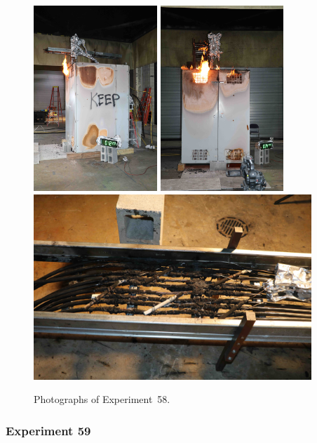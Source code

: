 \documentclass[12pt]{article}
\begin{document}
\begin{figure}[p]
\centering
\includegraphics[height=2.75in,angle=-90]{../FIGURES/Test_58_12_min_29_s}
\includegraphics[height=2.75in,angle=-90]{../FIGURES/Test_58_34_min_44_s} \\
\includegraphics[height=2.75in]{../FIGURES/Test_58_scar}
\caption[Photographs of Experiment~58]{Photographs of Experiment~58.}
\label{fig:Test_58_photos}
\end{figure}


\clearpage

\subsubsection{Experiment 59}
\end{document}
